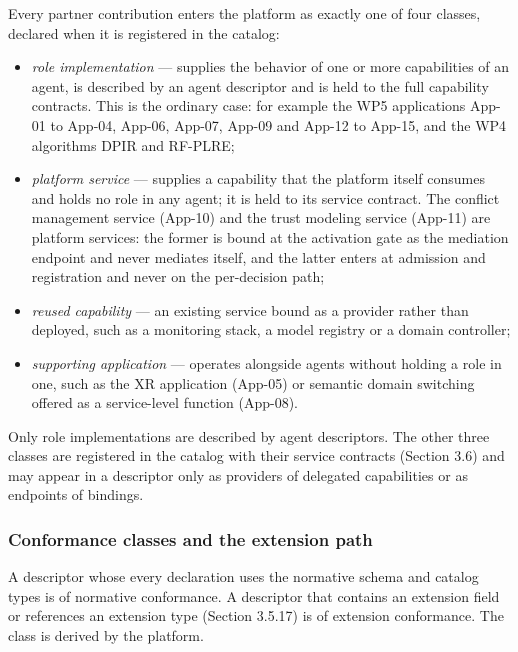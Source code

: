 Every partner contribution enters the platform as exactly one of four
classes, declared when it is registered in the catalog:

\begin{itemize}
\tightlist
\item
  \emph{role implementation} --- supplies the behavior of one or more
  capabilities of an agent, is described by an agent descriptor and is
  held to the full capability contracts. This is the ordinary case: for
  example the WP5 applications App-01 to App-04, App-06, App-07, App-09
  and App-12 to App-15, and the WP4 algorithms DPIR and RF-PLRE;
\item
  \emph{platform service} --- supplies a capability that the platform
  itself consumes and holds no role in any agent; it is held to its
  service contract. The conflict management service (App-10) and the
  trust modeling service (App-11) are platform services: the former is
  bound at the activation gate as the mediation endpoint and never
  mediates itself, and the latter enters at admission and registration
  and never on the per-decision path;
\item
  \emph{reused capability} --- an existing service bound as a provider
  rather than deployed, such as a monitoring stack, a model registry or
  a domain controller;
\item
  \emph{supporting application} --- operates alongside agents without
  holding a role in one, such as the XR application (App-05) or semantic
  domain switching offered as a service-level function (App-08).
\end{itemize}

Only role implementations are described by agent descriptors. The other
three classes are registered in the catalog with their service contracts
(Section 3.6) and may appear in a descriptor only as providers of
delegated capabilities or as endpoints of bindings.

\hypertarget{conformance-classes-and-the-extension-path}{%
\subsubsection{Conformance classes and the extension path}\label{conformance-classes-and-the-extension-path}}

A descriptor whose every declaration uses the normative schema and
catalog types is of normative conformance. A descriptor that contains an
extension field or references an extension type (Section 3.5.17) is of
extension conformance. The class is derived by the platform.

